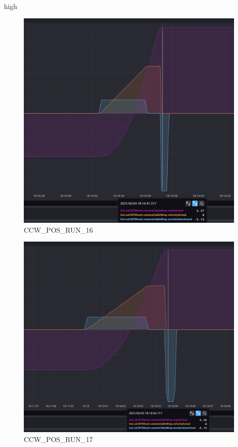 high\documentclass[SE,lsstdraft,authoryear,toc]{lsstdoc}
\begin{document}
\begin{figure}[h!]
  \includegraphics[width=\linewidth]{media/CCW_design_speed_pos_test16.png}
  \caption{CCW\_POS\_RUN\_16}
  \label{fig:CCW_POS_RUN_16}
\end{figure}
\begin{figure}[h!]
  \includegraphics[width=\linewidth]{media/CCW_design_speed_pos_test17.png}
  \caption{CCW\_POS\_RUN\_17}
  \label{fig:CCW_POS_RUN_17}
\end{figure}
\end{document}
